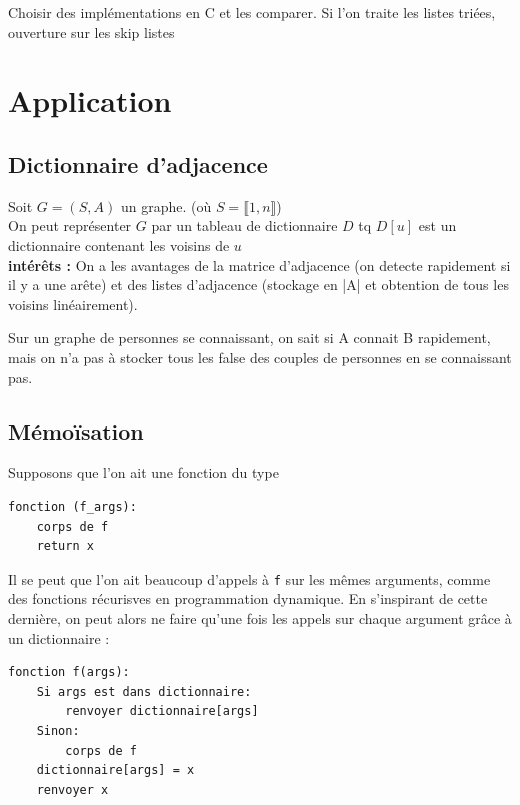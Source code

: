 \begin{exercise}
	Choisir des implémentations en C et les comparer. Si l'on traite les listes triées, ouverture sur les skip listes
\end{exercise}

\section{Application}

\subsection{Dictionnaire d'adjacence}

Soit $G=(S, A)$ un graphe. (où $S = \llbracket 1, n \rrbracket$)\\

On peut représenter $G$ par un tableau de dictionnaire $D$ tq $D[u]$ est un dictionnaire contenant les voisins de $u$\\

\textbf{intérêts :} On a les avantages de la matrice d'adjacence (on detecte rapidement si il y a une arête) et des listes d'adjacence (stockage en |A| et obtention de tous les voisins linéairement).\\

\begin{example}
	Sur un graphe de personnes se connaissant, on sait si A connait B rapidement, mais on n'a pas à stocker tous les false des couples de personnes en se connaissant pas.
\end{example}

\subsection{Mémoïsation}
Supposons que l'on ait une fonction du type
\begin{lstlisting}
fonction (f_args):
    corps de f
    return x
\end{lstlisting}

Il se peut que l'on ait beaucoup d'appels à \texttt f sur les mêmes arguments, comme des fonctions récurisves en programmation dynamique. En s'inspirant de cette dernière, on peut alors ne faire qu'une fois les appels sur chaque argument grâce à un dictionnaire :

\begin{lstlisting}
fonction f(args):
    Si args est dans dictionnaire:
        renvoyer dictionnaire[args]
    Sinon:
        corps de f
    dictionnaire[args] = x
    renvoyer x
\end{lstlisting}

